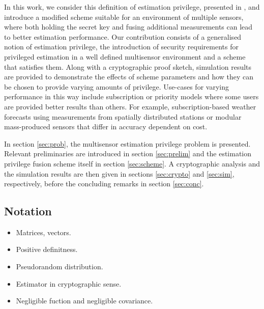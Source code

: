 \documentclass[conference]{IEEEtran}
\begin{document}
In this work, we consider this definition of estimation privilege, presented in \cite{risticCryptographicallyPrivilegedState2022}, and introduce a modified scheme suitable for an environment of multiple sensors, where both holding the secret key and fusing additional measurements can lead to better estimation performance. Our contribution consists of a generalised notion of estimation privilege, the introduction of security requirements for privileged estimation in a well defined multisensor environment and a scheme that satisfies them. Along with a cryptographic proof sketch, simulation results are provided to demonstrate the effects of scheme parameters and how they can be chosen to provide varying amounts of privilege. Use-cases for varying performance in this way include subscription or priority models where some users are provided better results than others. For example, subscription-based weather forecasts using measurements from spatially distributed stations or modular mass-produced sensors that differ in accuracy dependent on cost.

In section \ref{sec:prob}, the multisensor estimation privilege problem is presented. Relevant preliminaries are introduced in section \ref{sec:prelim} and the estimation privilege fusion scheme itself in section \ref{sec:scheme}. A cryptographic analysis and the simulation results are then given in sections \ref{sec:crypto} and \ref{sec:sim}, respectively, before the concluding remarks in section \ref{sec:conc}.

\subsection{Notation}\label{subsec:notation}
\begin{itemize}
  \item Matrices, vectors.
  \item Positive definitness.
  \item Pseudorandom distribution.
  \item Estimator in cryptographic sense.
  \item Negligible fuction and negligible covariance.
\end{itemize}

% 
%                                              
%                                              
%                                              
% 
\end{document}
